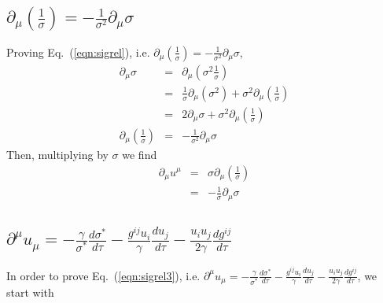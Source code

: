 \documentclass[aps,article]{revtex4}
\begin{document}
\subsection{$\partial_{\mu}\left(\frac{1}{\sigma}\right)=-\frac{1}{\sigma^2}\partial_{\mu}\sigma$}

Proving Eq.\ (\ref{eqn:sigrel}), i.e. $\partial_{\mu}\left(\frac{1}{\sigma}\right)=-\frac{1}{\sigma^2}\partial_{\mu}\sigma$,
\begin{eqnarray}
\partial_{\mu}\sigma&=&\partial_{\mu}\left(\sigma^2\frac{1}{\sigma}\right)\nonumber\\
&=&\frac{1}{\sigma}\partial_{\mu}\left(\sigma^2\right)+\sigma^2\partial_{\mu}\left(\frac{1}{\sigma}\right)\nonumber\\
&=&2\partial_{\mu}\sigma+\sigma^2\partial_{\mu}\left(\frac{1}{\sigma}\right)\nonumber\\
\partial_{\mu}\left(\frac{1}{\sigma}\right)&=&  -\frac{1}{\sigma^2}\partial_{\mu}\sigma
\end{eqnarray}
Then, multiplying by $\sigma$ we find
\begin{eqnarray}
\partial_{\mu}u^{\mu}&=&\sigma\partial_{\mu}\left(\frac{1}{\sigma}\right)\nonumber\\
&=&-\frac{1}{\sigma}\partial_{\mu}\sigma
\end{eqnarray}

\subsection{ $\partial^{\mu}u_{\mu}=-\frac{\gamma}{\sigma^*}\frac{d\sigma^*}{d\tau}-\frac{g^{ij}u_i}{\gamma}\frac{du_j}{d\tau}-\frac{u_i u_j}{2\gamma}\frac{d g^{ij}}{d\tau}$}

In order to prove Eq.\ (\ref{eqn:sigrel3}), i.e. $\partial^{\mu}u_{\mu}=-\frac{\gamma}{\sigma^*}\frac{d\sigma^*}{d\tau}-\frac{g^{ij}u_i}{\gamma}\frac{du_j}{d\tau}-\frac{u_i u_j}{2\gamma}\frac{d g^{ij}}{d\tau}$, we start with 
\end{document}

